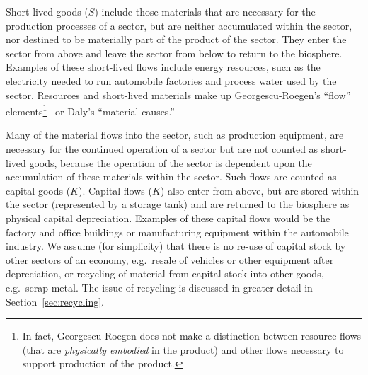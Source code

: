 Short-lived goods ($\dot{S}$)
include those materials 
that are necessary for the production processes of a sector, 
but are neither accumulated within the sector, 
nor destined to be materially part of the product of the sector. 
They enter the sector from above and leave the sector from
below to return to the biosphere. 
Examples of these short-lived flows include energy resources, such as
the electricity needed to run automobile factories 
and process water used by the sector. 
Resources and short-lived materials make up 
Georgescu-Roegen's ``flow'' elements\footnote{In
fact,
Georgescu-Roegen does not make a distinction between
resource flows (that are \emph{physically embodied}
in the product) and other flows necessary to support production
of the product.
}~\cite{G-R1970} 
or Daly's ``material causes.''~\cite{Daly2006}

Many of the material flows into the sector, 
such as production equipment,
are necessary for the continued operation of a sector 
but are not counted as short-lived goods, 
because the operation of the sector is dependent 
upon the accumulation 
of these materials within the sector. 
Such flows are counted as capital goods ($K$).
Capital flows ($\dot{K}$) also enter from above, 
but are stored within the sector 
(represented by a storage tank) 
and are returned to the biosphere as 
physical capital depreciation.
Examples of these capital flows would be the factory and office buildings or
manufacturing equipment within the automobile industry.
We assume (for simplicity) that there is no re-use of capital stock
by other sectors of an economy,
e.g.\ resale of vehicles or other equipment after depreciation,
or recycling of material from capital stock into other goods,
e.g.\ scrap metal. 
The issue of recycling is discussed in greater detail in
Section~\ref{sec:recycling}.

